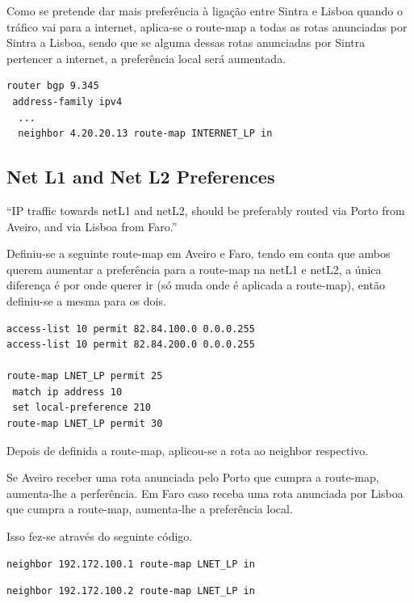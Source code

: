 \documentclass[11pt,a4paper]{report}
\begin{document}
Como se pretende dar mais preferência à ligação entre Sintra e Lisboa quando o tráfico vai para a internet, aplica-se o route-map a todas as rotas anunciadas por Sintra a Lisboa, sendo que se alguma dessas rotas anunciadas por Sintra pertencer a internet, a preferência local será aumentada.\\

\begin{lstlisting}[caption=Route-map da Internet no Neighbor Sintra no Router de Lisboa]
router bgp 9.345
 address-family ipv4
  ...
  neighbor 4.20.20.13 route-map INTERNET_LP in
\end{lstlisting}

\subsection{Net L1 and Net L2 Preferences}

``IP traffic towards netL1 and netL2, should be preferably routed via Porto from Aveiro, and via Lisboa from Faro.''
\newline

Definiu-se a seguinte route-map em Aveiro e Faro, tendo em conta que ambos querem aumentar a preferência para a route-map na netL1 e netL2, a única diferença é por onde querer ir (só muda onde é aplicada a route-map), então definiu-se a mesma para os dois.

\begin{lstlisting}[caption=Route-map para a netL1 e netL2]
access-list 10 permit 82.84.100.0 0.0.0.255
access-list 10 permit 82.84.200.0 0.0.0.255

route-map LNET_LP permit 25
 match ip address 10
 set local-preference 210
route-map LNET_LP permit 30
\end{lstlisting}

Depois de definida a route-map, aplicou-se a rota ao neighbor respectivo.

Se Aveiro receber uma rota anunciada pelo Porto que cumpra a route-map, aumenta-lhe a perferência. Em Faro caso receba uma rota anunciada por Lisboa que cumpra a route-map, aumenta-lhe a preferência local.

Isso fez-se através do seguinte código.\\
\begin{lstlisting}[caption=Route-map LNET\_LP no Neighbor Porto no Router de Aveiro]
  neighbor 192.172.100.1 route-map LNET_LP in
\end{lstlisting}

\begin{lstlisting}[caption=Route-map LNET\_LP no Neighbor Lisboa no Router de Faro]
  neighbor 192.172.100.2 route-map LNET_LP in
\end{lstlisting}
\end{document}
